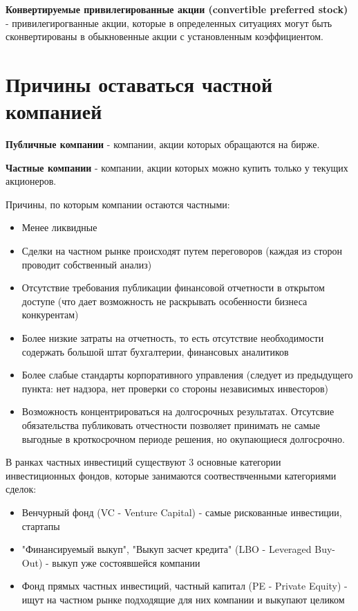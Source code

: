 \documentclass{article}
\begin{document}
\textbf{Конвертируемые привилегированные акции (convertible preferred stock)} - привилегирогванные акции, которые в определенных ситуациях могут быть сконвертированы в обыкновенные акции с установленным коэффициентом. 


\section{Причины оставаться частной компанией}

\textbf{Публичные компании } - компании, акции которых обращаются на бирже.

\textbf{Частные компании } - компании, акции которых можно купить только у текущих акционеров.

Причины, по которым компании остаются частными:

\begin{itemize}
     \item Менее ликвидные
     \item Сделки на частном рынке происходят путем переговоров (каждая из сторон проводит собственный анализ)
     \item Отсутствие требования публикации финансовой отчетности в открытом доступе (что дает возможность не раскрывать особенности бизнеса конкурентам)
     \item Более низкие затраты на отчетность, то есть отсутствие необходимости содержать большой штат бухгалтерии, финансовых аналитиков
     \item Более слабые стандарты корпоративного управления (следует из предыдущего пункта: нет надзора, нет проверки со стороны независимых инвесторов)
     \item Возможность концентрироваться на долгосрочных результатах. Отсутсвие обязательства публиковать отчестности позволяет принимать не самые выгодные в кроткосрочном периоде решения, но окупающиеся долгосрочно.
\end{itemize}

В ранках частных инвестиций существуют 3 основные категории инвестиционных фондов, которые занимаются соотвествченными категориями сделок: 
\begin{itemize}
     \item Венчурный фонд (VC - Venture Capital) - самые рискованные инвестиции, стартапы 
     \item "Финансируемый выкуп", "Выкуп засчет кредита" (LBO - Leveraged Buy-Out) -  выкуп уже состоявшейся компании
     \item Фонд прямых частных инвестиций, частный капитал (PE - Private Equity) - ищут на частном рынке подходящие для них компании и выкупают целиком
\end{itemize}
\end{document}
